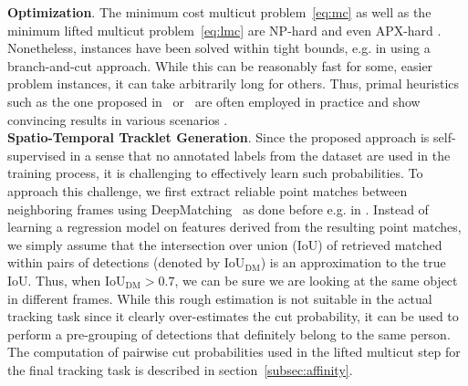 \noindent\textbf{Optimization}.
The minimum cost multicut problem~\eqref{eq:mc} as well as the minimum lifted multicut problem~\eqref{eq:lmc} are NP-hard \cite{bansal-2004} and even APX-hard \cite{demaine-2006,hornakova-2017}. 
Nonetheless, instances have been solved within tight bounds, e.g. in \cite{andres-2012-globally} using a branch-and-cut approach. 
While this can be reasonably fast for some, easier problem instances, it can take arbitrarily long for others. 
Thus, primal heuristics such as the one proposed in~\cite{keupericcv} or~\cite{CGC} are often employed in practice and show convincing results in various scenarios \cite{keupericcv,tang2017multiple,insafutdinov2016deepercut,node_agglom}.\\

\noindent\textbf{Spatio-Temporal Tracklet Generation}.
Since the proposed approach is self-supervised in a sense that no annotated labels from the dataset are used in the training process, it is challenging to effectively learn such probabilities. 
To approach this challenge, we first extract reliable point matches between neighboring frames using DeepMatching~\cite{dm} as done before e.g. in \cite{tang2016multi,tang2017multiple,keuper2018motion}. 
Instead of learning a regression model on features derived from the resulting point matches, we simply assume that the intersection over union (IoU) of retrieved matched within pairs of detections (denoted by IoU$_{\mathrm{DM}}$) is an approximation to the true IoU. 
Thus, when IoU$_{\mathrm{DM}}>0.7$, we can be sure we are looking at the same object in different frames. 
While this rough estimation is not suitable in the actual tracking task since it clearly over-estimates the cut probability, it can be used to perform a pre-grouping of detections that definitely belong to the same person. 
The computation of pairwise cut probabilities used in the lifted multicut step for the final tracking task is described in section~\ref{subsec:affinity}.
